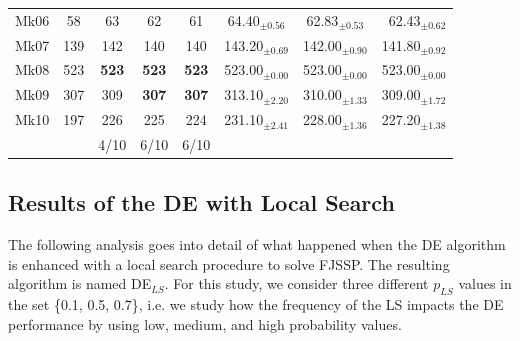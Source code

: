 \begin{table}[!tb]
\begin{tabular}{|rrcccrrr|}
    \multicolumn{1}{|c|}{Mk06} & \multicolumn{1}{c|}{58} & \multicolumn{1}{c|}{63} & \multicolumn{1}{c|}{62} & \multicolumn{1}{c|}{61} & \multicolumn{1}{c|}{64.40$_{\pm 0.56}$} & \multicolumn{1}{c|}{62.83$_{\pm 0.53}$} & 62.43$_{\pm 0.62}$ \bigstrut\\
    \multicolumn{1}{|c|}{Mk07} & \multicolumn{1}{c|}{139} & \multicolumn{1}{c|}{142} & \multicolumn{1}{c|}{140} & \multicolumn{1}{c|}{140} & \multicolumn{1}{c|}{143.20$_{\pm 0.69}$} & \multicolumn{1}{c|}{142.00$_{\pm 0.90}$} & 141.80$_{\pm 0.92}$ \bigstrut\\
    \multicolumn{1}{|c|}{Mk08} & \multicolumn{1}{c|}{523} & \multicolumn{1}{c|}{\textbf{523}} & \multicolumn{1}{c|}{\textbf{523}} & \multicolumn{1}{c|}{\textbf{523}} & \multicolumn{1}{c|}{523.00$_{\pm 0.00}$} & \multicolumn{1}{c|}{523.00$_{\pm 0.00}$} & 523.00$_{\pm 0.00}$ \bigstrut\\
    \multicolumn{1}{|c|}{Mk09} & \multicolumn{1}{c|}{307} & \multicolumn{1}{c|}{309} & \multicolumn{1}{c|}{\textbf{307}} & \multicolumn{1}{c|}{\textbf{307}} & \multicolumn{1}{c|}{313.10$_{\pm 2.20}$} & \multicolumn{1}{c|}{310.00$_{\pm 1.33}$} & 309.00$_{\pm 1.72}$ \bigstrut\\
    \multicolumn{1}{|c|}{Mk10} & \multicolumn{1}{c|}{197} & \multicolumn{1}{c|}{226} & \multicolumn{1}{c|}{225} & \multicolumn{1}{c|}{224} & \multicolumn{1}{c|}{231.10$_{\pm 2.41}$} & \multicolumn{1}{c|}{228.00$_{\pm 1.36}$} & 227.20$_{\pm 1.38}$ \bigstrut\\
    \hline
    \multicolumn{2}{c|}{}   & 4/10  & 6/10  &\multicolumn{1}{c|}{6/10}\bigstrut\\
    \cline{3-5}
    \end{tabular}%
  \label{tab:DELS}%
\end{table}%

\subsection{Results of the DE with Local Search} \label{subsec:resDELS}

The following analysis goes into detail of what happened when the DE algorithm is enhanced with a local search procedure to solve FJSSP. The resulting algorithm is named DE$_{LS}$. For this study, we consider three different $p_{LS}$ values in the set \{0.1, 0.5, 0.7\}, i.e. we study how the frequency of the LS impacts the DE performance by using low, medium, and high probability values.

